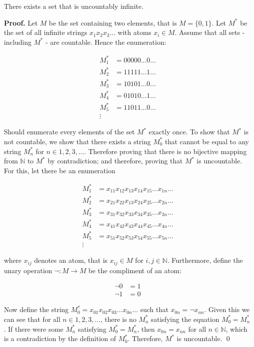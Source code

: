\documentclass[10pt, letterpaper]{article}
\begin{document}
\begin{theorem}
There exists a set that is uncountably infinite.

\textbf{Proof.} Let $M$ be the set containing two elements, that is $M = \{0, 1\}$. Let $M^*$ be the set of all infinite
strings $x_1 x_2 x_3 \ldots$ with atoms $x_i \in M$. Assume that all sets - including $M^*$ - are countable. Hence the
enumeration:

\begin{align*}
M^*_1 &= 00000 \ldots 0 \dots \\
M^*_2 &= 11111 \ldots 1 \dots \\
M^*_3 &= 10101 \ldots 0 \dots \\
M^*_4 &= 01010 \ldots 1 \dots \\
M^*_5 &= 11011 \ldots 0 \dots \\
\vdots
\end{align*}

Should enumerate every elements of the set $M^*$ exactly once. To show that $M^*$ is not countable, we show that there
exists a string $M^*_0$ that cannot be equal to any string $M^*_n$ for $n \in 1, 2, 3, ...$. Therefore proving that
there is no bijective mapping from $\mathbb{N}$ to $M^*$ by contradiction; and therefore, proving that $M^*$ is
uncountable. For this, let there be an enumeration

\begin{align*}
M^*_1 &= x_{11} x_{12} x_{13} x_{14} x_{15} \ldots x_{1n} \dots \\
M^*_2 &= x_{21} x_{22} x_{13} x_{24} x_{25} \ldots x_{2n} \dots \\
M^*_3 &= x_{31} x_{32} x_{33} x_{34} x_{35} \ldots x_{3n} \dots \\
M^*_4 &= x_{41} x_{42} x_{43} x_{44} x_{45} \ldots x_{4n} \dots \\
M^*_5 &= x_{51} x_{52} x_{53} x_{54} x_{55} \ldots x_{5n} \dots \\
\vdots
\end{align*}

where $x_{ij}$ denotes an atom, that is $x_{ij} \in M$ for $i, j \in \mathbb{N}$. Furthermore, define the unary
operation $\neg : M \to M$ be the compliment of an atom:

\begin{align*}
\neg 0 &= 1 \\
\neg 1 &= 0
\end{align*}

Now define the string $M^*_0 = x_{01} x_{02} x_{03} \dots x_{0n} \dots$ such that $x_{0n} = \neg x_{nn}$. Given this we
can see that for all $n \in {1, 2, 3, \dots}$, there is no $M^*_n$ satisfying the equation $M^*_0 = M^*_n$. If there
were some $M^*_n$ satisfying $M^*_0 = M^*_n$, then $x_{0n} = x_{nn}$ for all $n \in \mathbb{N}$, which is a
contradiction by the definition of $M^*_0$. Therefore, $M^*$ is uncountable. \qed
\end{theorem}
\end{document}
